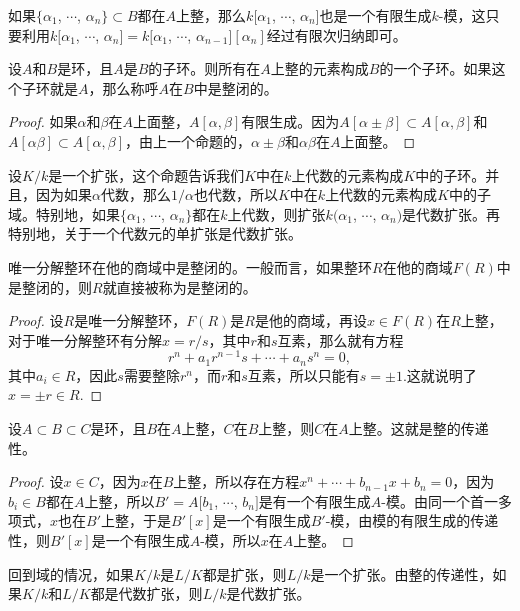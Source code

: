 如果$\{\alpha_1$, $\cdots$, $\alpha_n\}\subset B$都在$A$上整，那么$k[\alpha_1$, $\cdots$, $\alpha_n]$也是一个有限生成$k$-模，这只要利用$k[\alpha_1$, $\cdots$, $\alpha_n]=k[\alpha_1$, $\cdots$, $\alpha_{n-1}][\alpha_n]$经过有限次归纳即可。

\para \label{iope}设$A$和$B$是环，且$A$是$B$的子环。则所有在$A$上整的元素构成$B$的一个子环。如果这个子环就是$A$，那么称呼$A$在$B$中是整闭的。

\begin{proof} 如果$\alpha$和$\beta$在$A$上面整，$A[\alpha,\beta]$有限生成。因为$A[\alpha\pm\beta]\subset A[\alpha,\beta]$和$A[\alpha\beta]\subset A[\alpha,\beta]$，由上一个命题的，$\alpha\pm\beta$和$\alpha\beta$在$A$上面整。\end{proof}

设$K/k$是一个扩张，这个命题告诉我们$K$中在$k$上代数的元素构成$K$中的子环。并且，因为如果$\alpha$代数，那么$1/\alpha$也代数，所以$K$中在$k$上代数的元素构成$K$中的子域。特别地，如果$\{\alpha_1$, $\cdots$, $\alpha_n\}$都在$k$上代数，则扩张$k(\alpha_1$, $\cdots$, $\alpha_n)$是代数扩张。再特别地，关于一个代数元的单扩张是代数扩张。

\para 唯一分解整环在他的商域中是整闭的。一般而言，如果整环$R$在他的商域$F(R)$中是整闭的，则$R$就直接被称为是整闭的。

\begin{proof} 
	设$R$是唯一分解整环，$F(R)$是$R$是他的商域，再设$x\in F(R)$在$R$上整，对于唯一分解整环有分解$x=r/s$，其中$r$和$s$互素，那么就有方程
	\[
		r^n+a_1r^{n-1}s+\cdots+a_n s^n=0,
	\]
	其中$a_i\in R$，因此$s$需要整除$r^n$，而$r$和$s$互素，所以只能有$s=\pm 1$.这就说明了$x=\pm r\in R$.
\end{proof}

\begin{pro}
设$A\subset B\subset C$是环，且$B$在$A$上整，$C$在$B$上整，则$C$在$A$上整。这就是整的传递性。
\end{pro}

\begin{proof} 
	设$x\in C$，因为$x$在$B$上整，所以存在方程$x^n+\cdots+b_{n-1}x+b_n=0$，因为$b_i\in B$都在$A$上整，所以$B'=A[b_1$, $\cdots$, $b_n]$是有一个有限生成$A$-模。由同一个首一多项式，$x$也在$B'$上整，于是$B'[x]$是一个有限生成$B'$-模，由模的有限生成的传递性，则$B'[x]$是一个有限生成$A$-模，所以$x$在$A$上整。
\end{proof}

回到域的情况，如果$K/k$是$L/K$都是扩张，则$L/k$是一个扩张。由整的传递性，如果$K/k$和$L/K$都是代数扩张，则$L/k$是代数扩张。

